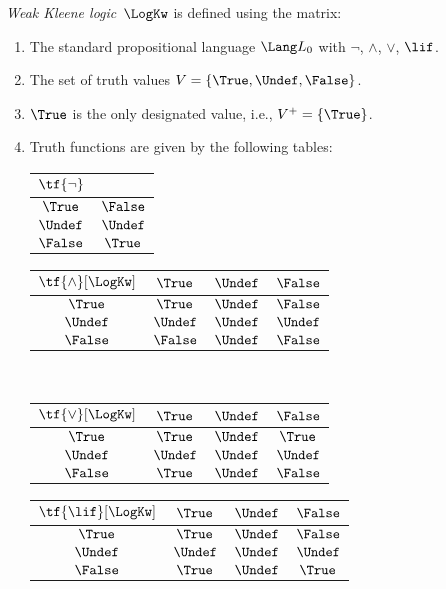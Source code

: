 \documentclass[../../../include/open-logic-section]{subfiles}
\begin{document}
\begin{defn}
\emph{Weak Kleene logic}~$\LogKw$ is defined using the matrix:
\begin{enumerate}
  \item The standard propositional language $\Lang L_0$ with
  $\lnot$, $\land$, $\lor$, $\lif$.
  \item The set of truth values $V = \{\True, \Undef, \False\}$.
  \item $\True$ is the only designated value, i.e., $V^+ = \{\True\}$.
  \item Truth functions are given by the following tables:
  \begin{center}
    \begin{tabular}{c|c} 
      $\tf{\lnot}$ & \\ 
      \hline  
      $\True$ & $\False$ \\ 
      $\Undef$ & $\Undef$ \\
      $\False$ & $\True$ 
    \end{tabular}
    \quad
    \begin{tabular}{c|ccc} 
      $\tf{\land}[\LogKw]$ & $\True$ & $\Undef$ & $\False$ \\ 
      \hline 
      $\True$ & $\True$ & $\Undef$ & $\False$ \\ 
      $\Undef$ & $\Undef$ & $\Undef$ & $\Undef$\\ 
      $\False$ & $\False$ & $\Undef$ & $\False$ 
    \end{tabular}
    \\[2ex]
    \begin{tabular}{c|ccc} 
      $\tf{\lor}[\LogKw]$ & $\True$ & $\Undef$ & $\False$ \\ 
      \hline 
      $\True$ & $\True$ & $\Undef$ & $\True$ \\ 
      $\Undef$ & $\Undef$ & $\Undef$ & $\Undef$ \\
      $\False$ & $\True$ & $\Undef$ & $\False$ 
    \end{tabular}
    \quad
    \begin{tabular}{c|ccc} 
      $\tf{\lif}[\LogKw]$ & $\True$ & $\Undef$ & $\False$ \\ 
      \hline 
      $\True$ & $\True$ & $\Undef$ & $\False$ \\ 
      $\Undef$ & $\Undef$ & $\Undef$ & $\Undef$  \\ 
      $\False$ & $\True$ & $\Undef$ & $\True$ 
    \end{tabular}
  \end{center} 
\end{enumerate}
\end{defn}
\end{document}
